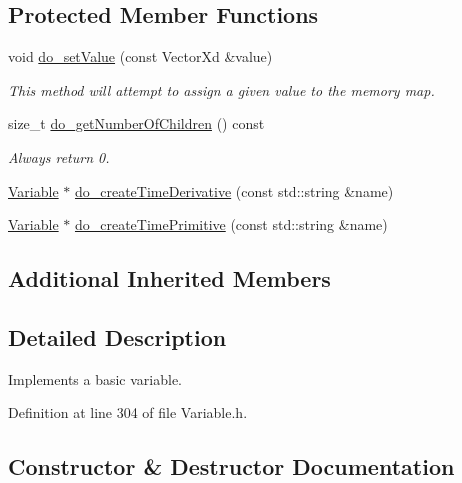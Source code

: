 \subsection*{Protected Member Functions}
\begin{DoxyCompactItemize}
\item 
void \hyperlink{classocra_1_1BaseVariable_a4f53b244e0efba4ca19f558113d29a9c}{do\+\_\+set\+Value} (const Vector\+Xd \&value)
\begin{DoxyCompactList}\small\item\em This method will attempt to assign a given value to the memory map. \end{DoxyCompactList}\item 
size\+\_\+t \hyperlink{classocra_1_1BaseVariable_a2e299821edf319296c4d70cbaab03486}{do\+\_\+get\+Number\+Of\+Children} () const 
\begin{DoxyCompactList}\small\item\em Always return 0. \end{DoxyCompactList}\end{DoxyCompactItemize}
{\bf }\par
\begin{DoxyCompactItemize}
\item 
\hyperlink{classocra_1_1Variable}{Variable} $\ast$ \hyperlink{classocra_1_1BaseVariable_a064b6501c110661e9fa12a0250d4de6b}{do\+\_\+create\+Time\+Derivative} (const std\+::string \&name)
\item 
\hyperlink{classocra_1_1Variable}{Variable} $\ast$ \hyperlink{classocra_1_1BaseVariable_ab010bd127ba34ff57168bf69182a78d5}{do\+\_\+create\+Time\+Primitive} (const std\+::string \&name)
\end{DoxyCompactItemize}

\subsection*{Additional Inherited Members}


\subsection{Detailed Description}
Implements a basic variable. 

Definition at line 304 of file Variable.\+h.



\subsection{Constructor \& Destructor Documentation}
